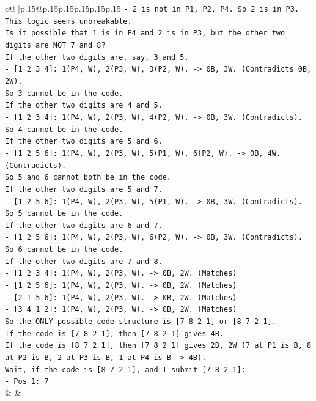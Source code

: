 \documentclass{article}
\begin{document}
{\begin{supertabular}{c@{$\;$}|p{.15\linewidth}@{}p{.15\linewidth}p{.15\linewidth}p{.15\linewidth}p{.15\linewidth}p{.15\linewidth}}
{{{\texttt{{-} 2 is not in P1, P2, P4. So 2 is in P3.} \\
\texttt{This logic seems unbreakable.} \\
\texttt{Is it possible that 1 is in P4 and 2 is in P3, but the other two digits are NOT 7 and 8?} \\
\texttt{If the other two digits are, say, 3 and 5.} \\
\texttt{{-} {[}1 2 3 4{]}: 1(P4, W), 2(P3, W), 3(P2, W). {-}> 0B, 3W. (Contradicts 0B, 2W).} \\
\texttt{So 3 cannot be in the code.} \\
\texttt{If the other two digits are 4 and 5.} \\
\texttt{{-} {[}1 2 3 4{]}: 1(P4, W), 2(P3, W), 4(P2, W). {-}> 0B, 3W. (Contradicts).} \\
\texttt{So 4 cannot be in the code.} \\
\texttt{If the other two digits are 5 and 6.} \\
\texttt{{-} {[}1 2 5 6{]}: 1(P4, W), 2(P3, W), 5(P1, W), 6(P2, W). {-}> 0B, 4W. (Contradicts).} \\
\texttt{So 5 and 6 cannot both be in the code.} \\
\texttt{If the other two digits are 5 and 7.} \\
\texttt{{-} {[}1 2 5 6{]}: 1(P4, W), 2(P3, W), 5(P1, W). {-}> 0B, 3W. (Contradicts).} \\
\texttt{So 5 cannot be in the code.} \\
\texttt{If the other two digits are 6 and 7.} \\
\texttt{{-} {[}1 2 5 6{]}: 1(P4, W), 2(P3, W), 6(P2, W). {-}> 0B, 3W. (Contradicts).} \\
\texttt{So 6 cannot be in the code.} \\
\texttt{If the other two digits are 7 and 8.} \\
\texttt{{-} {[}1 2 3 4{]}: 1(P4, W), 2(P3, W). {-}> 0B, 2W. (Matches)} \\
\texttt{{-} {[}1 2 5 6{]}: 1(P4, W), 2(P3, W). {-}> 0B, 2W. (Matches)} \\
\texttt{{-} {[}2 1 5 6{]}: 1(P4, W), 2(P3, W). {-}> 0B, 2W. (Matches)} \\
\texttt{{-} {[}3 4 1 2{]}: 1(P4, W), 2(P3, W). {-}> 0B, 2W. (Matches)} \\
\texttt{So the ONLY possible code structure is {[}7 8 2 1{]} or {[}8 7 2 1{]}.} \\
\texttt{If the code is {[}7 8 2 1{]}, then {[}7 8 2 1{]} gives 4B.} \\
\texttt{If the code is {[}8 7 2 1{]}, then {[}7 8 2 1{]} gives 2B, 2W (7 at P1 is B, 8 at P2 is B, 2 at P3 is B, 1 at P4 is B {-}> 4B).} \\
\texttt{Wait, if the code is {[}8 7 2 1{]}, and I submit {[}7 8 2 1{]}:} \\
\texttt{{-} Pos 1: 7} \\
            }
        }
    }
    & & \\ \\


\end{supertabular}}
\end{document}
